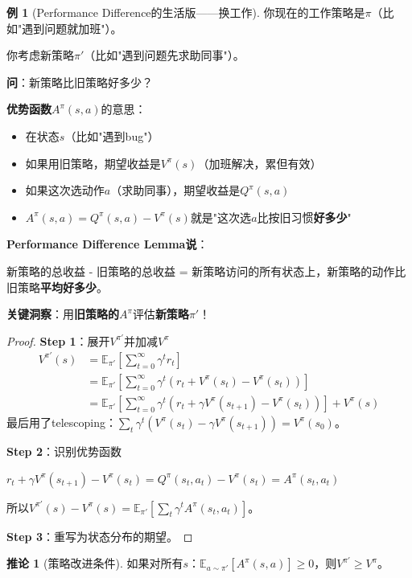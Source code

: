 \documentclass[11pt,a4paper]{article}
\theoremstyle{definition}
\newtheorem{example}{例}[section]
\newtheorem{corollary}{推论}[section]
\begin{document}
\begin{example}[Performance Difference的生活版——换工作]
你现在的工作策略是$\pi$（比如"遇到问题就加班"）。

你考虑新策略$\pi'$（比如"遇到问题先求助同事"）。

\textbf{问}：新策略比旧策略好多少？

\textbf{优势函数}$A^\pi(s, a)$的意思：
\begin{itemize}
    \item 在状态$s$（比如"遇到bug"）
    \item 如果用旧策略，期望收益是$V^\pi(s)$（加班解决，累但有效）
    \item 如果这次选动作$a$（求助同事），期望收益是$Q^\pi(s, a)$
    \item $A^\pi(s, a) = Q^\pi(s, a) - V^\pi(s)$就是"这次选$a$比按旧习惯\textbf{好多少}"
\end{itemize}

\textbf{Performance Difference Lemma说}：

新策略的总收益 - 旧策略的总收益 = 新策略访问的所有状态上，新策略的动作比旧策略\textbf{平均好多少}。

\textbf{关键洞察}：用\textbf{旧策略的}$A^\pi$评估\textbf{新策略}$\pi'$！
\end{example}

\begin{proof}
\textbf{Step 1}：展开$V^{\pi'}$并加减$V^\pi$
\begin{align*}
V^{\pi'}(s) &= \mathbb{E}_{\pi'}\left[\sum_{t=0}^\infty \gamma^t r_t\right] \\
&= \mathbb{E}_{\pi'}\left[\sum_{t=0}^\infty \gamma^t (r_t + V^\pi(s_t) - V^\pi(s_t))\right] \\
&= \mathbb{E}_{\pi'}\left[\sum_{t=0}^\infty \gamma^t (r_t + \gamma V^\pi(s_{t+1}) - V^\pi(s_t))\right] + V^\pi(s)
\end{align*}
最后用了telescoping：$\sum_t \gamma^t(V^\pi(s_t) - \gamma V^\pi(s_{t+1})) = V^\pi(s_0)$。

\textbf{Step 2}：识别优势函数

$r_t + \gamma V^\pi(s_{t+1}) - V^\pi(s_t) = Q^\pi(s_t, a_t) - V^\pi(s_t) = A^\pi(s_t, a_t)$

所以$V^{\pi'}(s) - V^\pi(s) = \mathbb{E}_{\pi'}[\sum_t \gamma^t A^\pi(s_t, a_t)]$。

\textbf{Step 3}：重写为状态分布的期望。
\end{proof}

\begin{corollary}[策略改进条件]
如果对所有$s$：$\mathbb{E}_{a \sim \pi'}[A^\pi(s, a)] \geq 0$，则$V^{\pi'} \geq V^\pi$。
\end{corollary}
\end{document}
